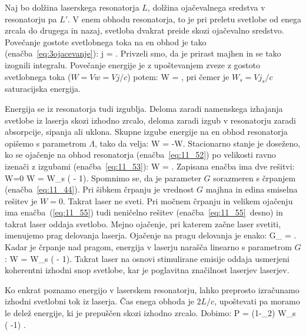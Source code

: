 Naj bo dolžina laserskega resonatorja $L$, dolžina ojačevalnega sredstva 
v resonatorju pa $L'$. V enem obhodu resonatorja, to je pri preletu svetlobe
od enega zrcala do drugega in nazaj, svetloba dvakrat preide skozi ojačevalno
sredstvo. Povečanje gostote svetlobnega toka na en obhod je tako 
(enačba~\ref{eq:3ojacevanje}):
\beq
\Delta j = .
\label{eq:11_51}
\eeq
Privzeli smo, da je prirast majhen in se tako izognili integralu.
Povečanje energije je z upoštevanjem zveze z gostoto
svetlobnega toka ($W = Vw = Vj/c$) potem:
\beq
\Delta W = ,
\label{eq:11_52}
\eeq
pri čemer je $W_s = Vj_s/c$ saturacijska energija. 

Energija se iz resonatorja tudi izgublja. Deloma zaradi namenskega 
izhajanja svetlobe iz laserja skozi izhodno zrcalo, deloma zaradi 
izgub v resonatorju zaradi absorpcije, sipanja ali uklona. Skupne izgube
energije na en obhod resonatorja opišemo s parametrom $\Lambda$, tako da velja:
\beq
\Delta W = -\Lambda W.
\label{eq:11_53}
\eeq
Stacionarno stanje je doseženo, ko se ojačenje na obhod resonatorja 
(enačba~\ref{eq:11_52}) po velikosti ravno izenači z izgubami (enačba~\ref{eq:11_53}):
\beq
\Lambda W = .
\label{eq:11_54}
\eeq
Zapisana enačba ima dve rešitvi:
\beq
W=0 \qquad {} \qquad W = W_s \left( - 1\right)\!\!.
\label{eq:11_55}
\eeq
Spomnimo se, da je parameter $G$ sorazmeren s črpanjem 
(enačba~\ref{eq:11_44}). Pri šibkem črpanju je vrednost $G$ majhna in 
edina smiselna rešitev je $W=0$. Takrat laser ne sveti. Pri močnem
črpanju in velikem ojačenju ima enačba~(\ref{eq:11_55}) tudi neničelno
rešitev (enačba~\ref{eq:11_55}\, desno) in takrat laser oddaja svetlobo. 
Mejno ojačenje, pri katerem začne laser svetiti, imenujemo prag 
delovanja laserja. Ojačenje na pragu delovanja je enako:
\beq
G_ = .
\label{eq:11_56}
\eeq
Kadar je črpanje nad pragom, energija v laserju narašča linearno s 
parametrom $G$:
\beq
W = W_s \left( - 1\right)\!\!.
\label{eq:11_57}
\eeq
Takrat laser na osnovi stimulirane emisije oddaja usmerjeni 
koherentni izhodni snop svetlobe, kar je poglavitna značilnost laserjev laserjev.

Ko enkrat poznamo energijo v laserskem resonatorju, lahko preprosto
izračunamo izhodni svetlobni tok iz laserja. Čas enega obhoda je $2L/c$,
upoštevati pa moramo le delež energije, ki je prepuščen skozi izhodno zrcalo. 
Dobimo: 
\beq
P = (1-_2) W_s \left( -1\right) .
\label{eq:11_58}
\eeq

